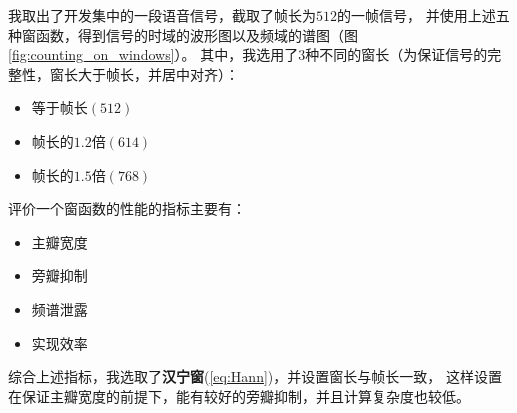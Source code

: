 \documentclass[a4paper]{article}
\begin{document}
\begin{enumerate}
{    我取出了开发集中的一段语音信号，截取了帧长为$512$的一帧信号，
    并使用上述五种窗函数，得到信号的时域的波形图以及频域的谱图（图\ref{fig:counting_on_windows}）。
    其中，我选用了$3$种不同的窗长（为保证信号的完整性，窗长大于帧长，并居中对齐）：
    \begin{itemize}
      \item 等于帧长$(512)$
      \item 帧长的$1.2$倍$(614)$
      \item 帧长的$1.5$倍$(768)$
    \end{itemize}
    评价一个窗函数的性能的指标主要有：
    \begin{itemize}
      \item 主瓣宽度
      \item 旁瓣抑制
      \item 频谱泄露
      \item 实现效率
    \end{itemize}
    综合上述指标，我选取了\textbf{汉宁窗}(\ref{eq:Hann})，并设置窗长与帧长一致，
    这样设置在保证主瓣宽度的前提下，能有较好的旁瓣抑制，并且计算复杂度也较低。
  }
\end{enumerate}
\end{document}
